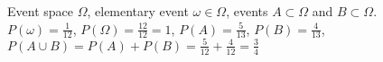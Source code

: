 \begin{figure}
\centering



\caption{Event space $\Omega$, elementary event 
  $\omega \in \Omega$, events $A \subset \Omega$ and
$B \subset \Omega$. 
$P\left(\omega\right) = \frac{1}{12}$, 
$P\left(\Omega\right) = \frac{12}{12} = 1$,
$P\left(A\right) = \frac{5}{13}$,
$P\left(B\right) = \frac{4}{13}$,
$P\left(A\cup B\right) = 
P\left(A\right) + P\left(B\right) = 
\frac{5}{12} + \frac{4}{12} = \frac{3}{4}$
}
\label{figAddProbabilityAxioms}
\end{figure}